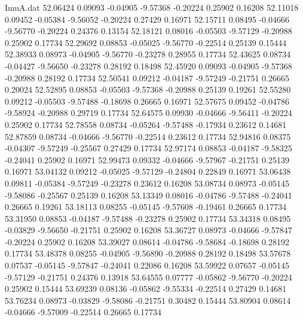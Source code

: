 \begin{filecontents}{ImuA.dat}
  52.06424    0.09093   -0.04905   -9.57368   -0.20224    0.25902    0.16208
  52.11018    0.09452   -0.05384   -9.56052   -0.20224    0.27429    0.16971
  52.15711    0.08495   -0.04666   -9.56770   -0.20224    0.24376    0.13154
  52.18121    0.08016   -0.05503   -9.57129   -0.20988    0.25902    0.17734
  52.29692    0.08853   -0.05025   -9.56770   -0.22514    0.25139    0.15444
  52.38933    0.08973   -0.04905   -9.56770   -0.23278    0.28955    0.17734
  52.43625    0.08734   -0.04427   -9.56650   -0.23278    0.28192    0.18498
  52.45920    0.09093   -0.04905   -9.57368   -0.20988    0.28192    0.17734
  52.50541    0.09212   -0.04187   -9.57249   -0.21751    0.26665    0.20024
  52.52895    0.08853   -0.05503   -9.57368   -0.20988    0.25139    0.19261
  52.55280    0.09212   -0.05503   -9.57488   -0.18698    0.26665    0.16971
  52.57675    0.09452   -0.04786   -9.58924   -0.20988    0.29719    0.17734
  52.64575    0.09930   -0.04666   -9.56411   -0.20224    0.25902    0.17734
  52.78558    0.08734   -0.05264   -9.57488   -0.17934    0.23612    0.14681
  52.87859    0.08734   -0.04666   -9.56770   -0.22514    0.23612    0.17734
  52.94816    0.08375   -0.04307   -9.57249   -0.25567    0.27429    0.17734
  52.97174    0.08853   -0.04187   -9.58325   -0.24041    0.25902    0.16971
  52.99473    0.09332   -0.04666   -9.57967   -0.21751    0.25139    0.16971
  53.04132    0.09212   -0.05025   -9.57129   -0.24804    0.22849    0.16971
  53.06438    0.09811   -0.05384   -9.57249   -0.23278    0.23612    0.16208
  53.08734    0.08973   -0.05145   -9.58086   -0.25567    0.25139    0.16208
  53.13349    0.08016   -0.04786   -9.57488   -0.24041    0.26665    0.19261
  53.18113    0.08255   -0.05145   -9.57608   -0.19461    0.26665    0.17734
  53.31950    0.08853   -0.04187   -9.57488   -0.23278    0.25902    0.17734
  53.34318    0.08495   -0.03829   -9.56650   -0.21751    0.25902    0.16208
  53.36727    0.08973   -0.04666   -9.57847   -0.20224    0.25902    0.16208
  53.39027    0.08614   -0.04786   -9.58684   -0.18698    0.28192    0.17734
  53.48378    0.08255   -0.04905   -9.56890   -0.20988    0.28192    0.18498
  53.57678    0.07537   -0.05145   -9.57847   -0.24041    0.22086    0.16208
  53.59922    0.07657   -0.05145   -9.57129   -0.21751    0.24376    0.13918
  53.64555    0.07777   -0.05862   -9.56770   -0.20224    0.25902    0.15444
  53.69239    0.08136   -0.05862   -9.55334   -0.22514    0.27429    0.14681
  53.76234    0.08973   -0.03829   -9.58086   -0.21751    0.30482    0.15444
  53.80904    0.08614   -0.04666   -9.57009   -0.22514    0.26665    0.17734

\end{filecontents}
